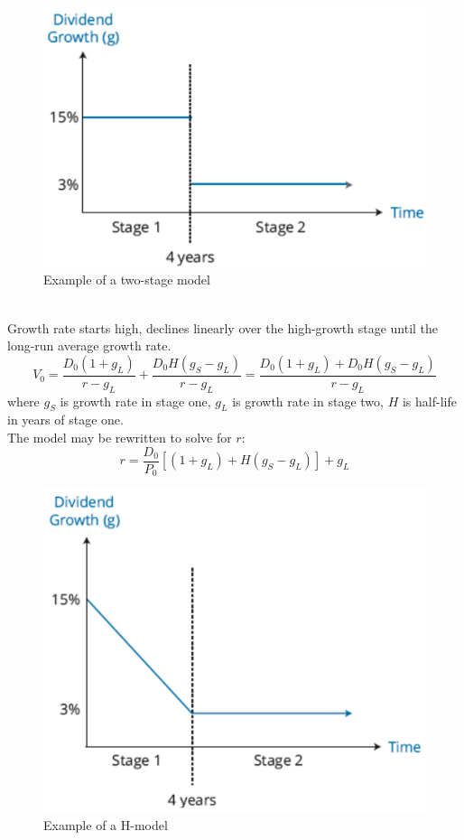 \begin{figure}[H]
\centering
\includegraphics[scale=0.4]{images/equity/twostage}
\caption{Example of a two-stage model}
\end{figure}

\begin{method} \\
Growth rate starts high, declines linearly over the high-growth stage until the long-run average growth rate.
\begin{equation}
V_0 = \frac{D_0 (1+g_L)}{r-g_L} + \frac{D_0 H (g_S - g_L)}{r-g_L} = \frac{D_0 (1+g_L) + D_0 H (g_S - g_L)}{r - g_L} \nonumber
\end{equation}
where $g_S$ is growth rate in stage one, $g_L$ is growth rate in stage two, $H$ is half-life in years of stage one.\\
The model may be rewritten to solve for $r$:
\begin{equation}
r = \frac{D_0}{P_0} [(1+g_L) + H(g_S - g_L)] + g_L \nonumber
\end{equation}
\end{method}

\begin{figure}[H]
\centering
\includegraphics[scale=0.4]{images/equity/hmodel}
\caption{Example of a H-model}
\end{figure}

